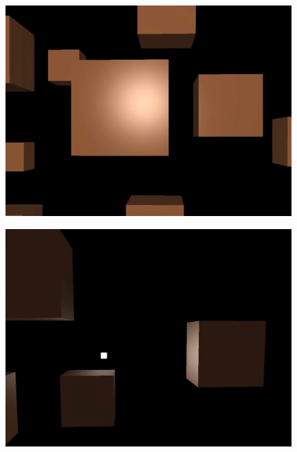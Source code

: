 \documentclass[a4paper, 12pt]{report}
\begin{document}
\begin{figure}[H]
    \centering
    \href{https://github.com/devprofile98/shm}{
        \includegraphics[width=11cm]{images/phong1.png}
    }
    \caption{\fontsize{11pt}{1.0cm}\zarbold\textbf{}}
    \label{\lr{fig:blin}}
\end{figure}

\begin{figure}[H]
    \centering
    \href{https://github.com/devprofile98/shm}{
        \includegraphics[width=11cm]{images/phong2.png}
    }
    \caption{\fontsize{11pt}{1.0cm}\zarbold\textbf{}}
    \label{fig:my_label}
\end{figure}
\end{document}
